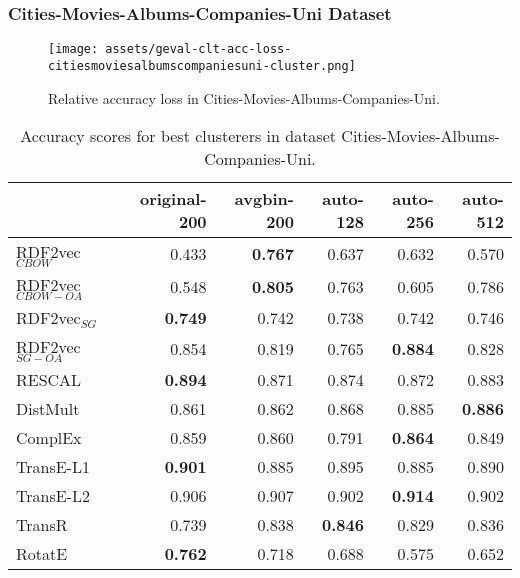\documentclass[11pt,titlepage,oneside,openany]{book}
\begin{document}
\newpage

\subsubsection{Cities-Movies-Albums-Companies-Uni Dataset}
\label{subsubsec:geval-results-clt-citiesmoviesalbumscompaniesuni-cluster}


\begin{figure}[H]
    \centering
    \texttt{[image: assets/geval-clt-acc-loss-citiesmoviesalbumscompaniesuni-cluster.png]}
    \vspace*{-3mm}
    \caption{Relative accuracy loss in Cities-Movies-Albums-Companies-Uni.}
    \label{fig:geval-clt-acc-loss-citiesmoviesalbumscompaniesuni-cluster}
\end{figure}


\begin{table}[H]
\centering
\begin{tabular}{lrrrrr}
\toprule
{} &  original-200 &  avgbin-200 &  auto-128 &  auto-256 &  auto-512 \\
\midrule
RDF2vec$_{CBOW}$     &         0.433  &	\textbf{0.767} &     0.637  &     0.632  &     0.570  \\
RDF2vec$_{CBOW-OA}$  &         0.548  &	\textbf{0.805} &     0.763  &     0.605  &     0.786  \\
RDF2vec$_{SG}$       &	\textbf{0.749} &       0.742  &     0.738  &     0.742  &     0.746  \\
RDF2vec$_{SG-OA}$    &         0.854  &       0.819  &     0.765  &	\textbf{0.884} &     0.828  \\
RESCAL               &	\textbf{0.894} &       0.871  &     0.874  &     0.872  &     0.883  \\
DistMult             &         0.861  &       0.862  &     0.868  &     0.885  &	\textbf{0.886} \\
ComplEx              &         0.859  &       0.860  &     0.791  &	\textbf{0.864} &     0.849  \\
TransE-L1            &	\textbf{0.901} &       0.885  &     0.895  &     0.885  &     0.890  \\
TransE-L2            &         0.906  &       0.907  &     0.902  &	\textbf{0.914} &     0.902  \\
TransR               &         0.739  &       0.838  &	\textbf{0.846} &     0.829  &     0.836  \\
RotatE               &	\textbf{0.762} &       0.718  &     0.688  &     0.575  &     0.652  \\
\bottomrule
\end{tabular}
\caption{Accuracy scores for best clusterers in dataset Cities-Movies-Albums-Companies-Uni.}
\label{tab:geval-clt-acc-citiesmoviesalbumscompaniesuni-cluster}
\end{table}
\end{document}
